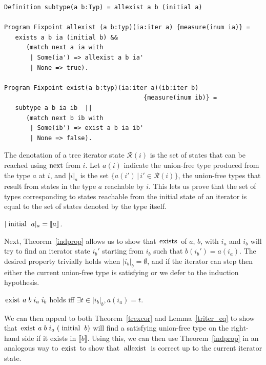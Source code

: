 \documentclass[a4paper,english]{lipics-v2019}
\newcommand{\denotes}[1]{\llbracket #1 \rrbracket}
\renewcommand{\c}[1]{\ensuremath{\text{\lstinline{#1}}}\xspace}
\begin{document}
\begin{lstlisting}
Definition subtype(a b:Typ) = allexist a b (initial a)

Program Fixpoint allexist (a b:typ)(ia:iter a) {measure(inum ia)} =
   exists a b ia (initial b) && 
      (match next a ia with 
       | Some(ia') => allexist a b ia' 
       | None => true).

Program Fixpoint exist(a b:typ)(ia:iter a)(ib:iter b)
                                      {measure(inum ib)} =
   subtype a b ia ib  || 
      (match next b ib with 
       | Some(ib') => exist a b ia ib' 
       | None => false).
\end{lstlisting}

\newcommand{\irdn}[1]{\ensuremath{\mathcal{R}({#1})}}
\newcommand{\irch}[2]{\ensuremath{|#1|_{#2}}}

\noindent
The denotation of a tree iterator state $\irdn{i}$ is the set of states that
can be reached using \c{next} from $i$. Let $a(i)$ indicate the union-free
type produced from the type $a$ at $i$, and \irch{i}{a} is the set
$\{a(i')\,|\,i'\in\irdn{i}\}$, the union-free types that result from states
in the type $a$ reachable by $i$.  This lets us prove that the set of types
corresponding to states reachable from the initial state of an iterator is
equal to the set of states denoted by the type itself.

\begin{lemma}\label{triter_eq}
$\irch{\c{initial}~a}{a} = \denotes{a}$.
\end{lemma}

\noindent
Next, Theorem~\ref{indprop} allows us to show that \c{exists} of $a$, $b$,
with $i_a$ and $i_b$ will try to find an iterator state $i_b'$ starting from
$i_b$ such that $b(i_b') = a(i_a)$. The desired property trivially holds
when $\irch{i_b}{b} = \emptyset$, and if the iterator can step then either
the current union-free type is satisfying or we defer to the induction
hypothesis.


\begin{theorem}\label{trexcor}
$\c{exist}\;a\;b\;i_a\;i_b$ holds iff $\exists t\in\irch{i_b}{b},a(i_a)= t$.
\end{theorem}

\noindent
We can then appeal to both Theorem~\ref{trexcor} and Lemma~\ref{triter_eq}
to show that $\c{exist}\;a\;b\;i_a\;(\c{initial}\;b)$ will find a satisfying
union-free type on the right-hand side if it exists in $\denotes{b}$. Using
this, we can then use Theorem~\ref{indprop} in an analogous way to \c{exist}
to show that \c{allexist} is correct up to the current iterator state.
\end{document}
